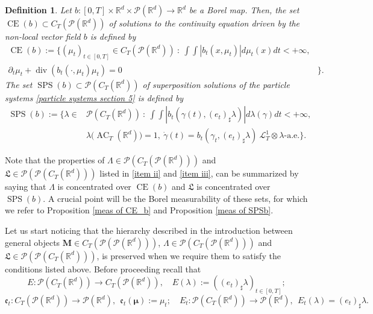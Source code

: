 \documentclass[10pt,leqno]{amsart}
\numberwithin{equation}{section}
\newtheorem{df}[teorema]{Definition}
\newcommand{\R}{\mathbb{R}}
\newcommand{\PP}{\mathcal{P}}
\newcommand{\CE}{\operatorname{CE}}
\begin{document}
\begin{df}\label{def: CE and SCE}
    Let $b:[0,T]\times \R^d \times \PP(\R^d) \to \R^d$ be a Borel map. Then, the set $\operatorname{CE}(b)\subset C_T(\PP(\R^d))$ of solutions to the continuity equation driven by the non-local vector field $b$ is defined by
    \begin{equation}\label{CEb}
\begin{aligned}
    \CE(b):= \bigg\{(\mu_t)_{t\in[0,T]} \in C_T(\PP(\R^d)) \ : \ 
    \int \int |b_t(x,\mu_t)|d\mu_t(x) dt <+\infty, & \\
    \partial_t\mu_t + \operatorname{div}(b_t(\cdot,\mu_t)\mu_t)=0& \bigg\}.
\end{aligned}
\end{equation}
The set $\operatorname{SPS}(b)\subset \PP(C_T(\R^d))$ of superposition solutions of the particle systems \eqref{particle systems section 5} is defined by
\begin{equation}\label{SPSb}
\begin{aligned}
    \operatorname{SPS}(b):= \{\lambda \in & \PP(C_T(\R^d)) \ : \ \int \int |b_t(\gamma(t),(e_t)_\sharp \lambda)| d\lambda(\gamma) dt<+\infty ,
    \\
    &\lambda \big( \operatorname{AC}_T(\R^d) \big) =1, \ \dot{\gamma}(t) = b_t(\gamma_t,(e_t)_\sharp \lambda) \ \mathcal{L}^1_T\otimes\lambda\text{-a.e.} \}.
\end{aligned}
\end{equation}
\end{df}

Note that the properties of $\Lambda\in\PP(C_T(\PP(\R^d)))$ and $\mathfrak{L}\in \PP(\PP(C_T(\R^d)))$ listed in \ref{item ii} and \ref{item iii}, can be summarized by saying that $\Lambda$ is concentrated over $\operatorname{CE}(b)$ and $\mathfrak{L}$ is concentrated over $\operatorname{SPS}(b)$. A crucial point will be the Borel measurability of these sets, for which we refer to Proposition \ref{meas of CE_b} and Proposition \ref{meas of SPSb}. 

Let us start noticing that the hierarchy described in the introduction between general objects $\boldsymbol{M}\in C_T(\PP(\PP(\R^d)))$, $\Lambda \in \PP(C_T(\PP(\R^d)))$ and $\mathfrak{L} \in \PP(\PP(C_T(\R^d)))$, is preserved when we require them to satisfy the conditions listed above. Before proceeding recall that 
\[E:\PP(C_T(\R^d)) \to C_T(\PP(\R^d)), \quad E(\lambda):= ((e_t)_\sharp \lambda)_{t\in [0,T]};\]
\[\mathfrak{e}_t:C_T(\PP(\R^d)) \to \PP(\R^d), \ \  \mathfrak{e}_t(\boldsymbol{\mu}) := \mu_t;\quad E_t : \PP(C_T(\R^d)) \to \PP(\R^d), \ \  E_t(\lambda) = (e_t)_\sharp \lambda.\]
\end{document}
